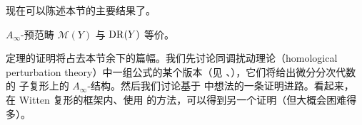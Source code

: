 现在可以陈述本节的主要结果了。

\begin{thm}
$A_\infty$-预范畴 $\mathcal{M}(Y)$ 与 $\mathrm{DR}(Y)$ 等价。
\end{thm}

定理的证明将占去本节余下的篇幅。我们先讨论同调扰动理论（homological perturbation
theory）中一组公式的某个版本（见 \cite{GS}、\cite{Me}），它们将给出微分分次代数的
子复形上的 $A_\infty$-结构。然后我们讨论基于 \cite{HL} 中想法的一条证明进路。看起来，
在 Witten 复形的框架内、使用 \cite{BZ} 的方法，可以得到另一个证明（但大概会困难得多）。


